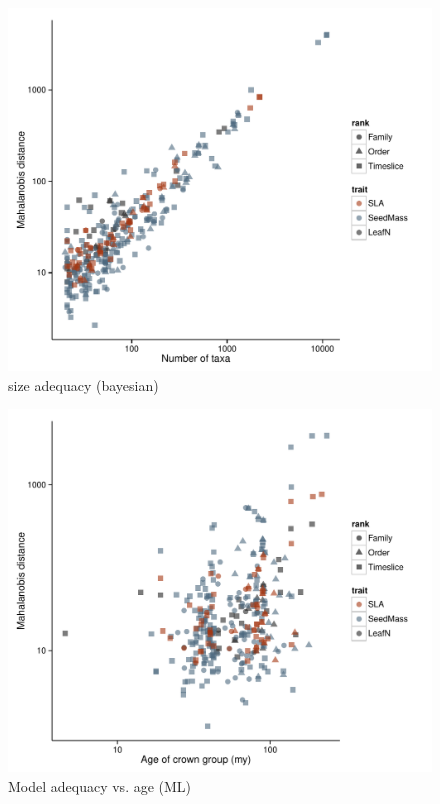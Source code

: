 \documentclass[a4paper,12pt]{article}
\begin{document}
\begin{figure}[p]
  \centering
  \includegraphics[scale=0.9]{figs/ad-size-bayes}
  \caption{size adequacy (bayesian)}
  \label{fig:supp-size-adequacy}
\end{figure}

\begin{figure}[p]
  \centering
  \includegraphics[scale=0.9]{figs/ad-age-ml}
  \caption{Model adequacy vs. age (ML)}
  \label{fig:supp-age-bayes}
\end{figure}
\end{document}
